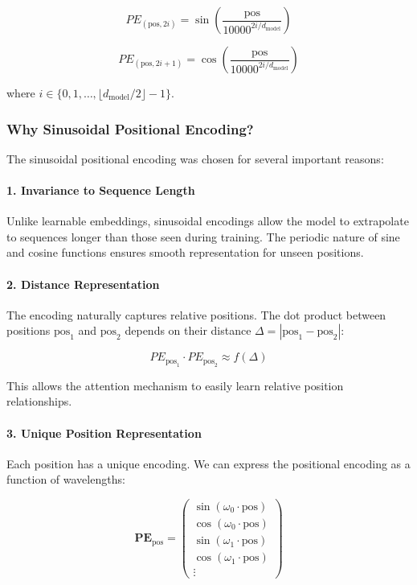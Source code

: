 \documentclass[11pt,a4paper]{article}
\begin{document}
\begin{equation}
PE_{(\text{pos}, 2i)} = \sin\left(\frac{\text{pos}}{10000^{2i/d_{\text{model}}}}\right)
\end{equation}

\begin{equation}
PE_{(\text{pos}, 2i+1)} = \cos\left(\frac{\text{pos}}{10000^{2i/d_{\text{model}}}}\right)
\end{equation}

where $i \in \{0, 1, \ldots, \lfloor d_{\text{model}}/2 \rfloor - 1\}$.

\subsubsection{Why Sinusoidal Positional Encoding?}

The sinusoidal positional encoding was chosen for several important reasons:

\paragraph{1. Invariance to Sequence Length}
Unlike learnable embeddings, sinusoidal encodings allow the model to extrapolate to sequences longer than those seen during training. The periodic nature of sine and cosine functions ensures smooth representation for unseen positions.

\paragraph{2. Distance Representation}
The encoding naturally captures relative positions. The dot product between positions $\text{pos}_1$ and $\text{pos}_2$ depends on their distance $\Delta = |\text{pos}_1 - \text{pos}_2|$:

\begin{equation}
PE_{\text{pos}_1} \cdot PE_{\text{pos}_2} \approx f(\Delta)
\end{equation}

This allows the attention mechanism to easily learn relative position relationships.

\paragraph{3. Unique Position Representation}
Each position has a unique encoding. We can express the positional encoding as a function of wavelengths:

\begin{equation}
\mathbf{PE}_{\text{pos}} = \begin{pmatrix}
\sin(\omega_0 \cdot \text{pos}) \\
\cos(\omega_0 \cdot \text{pos}) \\
\sin(\omega_1 \cdot \text{pos}) \\
\cos(\omega_1 \cdot \text{pos}) \\
\vdots
\end{pmatrix}
\end{equation}
\end{document}
